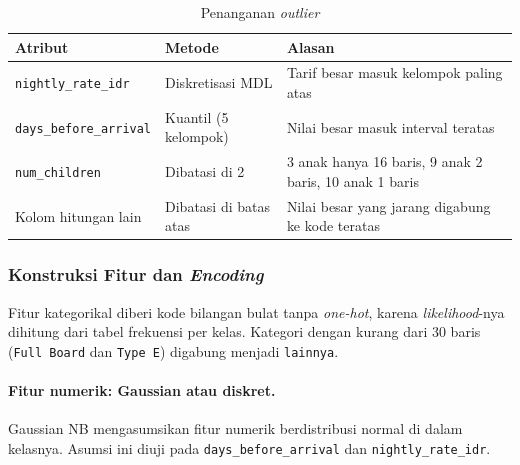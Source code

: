 {\small
{}\par}

\begin{table}[H]
	\centering
	\caption{Penanganan \textit{outlier}}
	\label{tab:nb-outlier}
	\begin{tabularx}{\textwidth}{l l Y}
		\toprule
		\textbf{Atribut} & \textbf{Metode} & \textbf{Alasan} \\
		\midrule
		\texttt{nightly\_rate\_idr} & Diskretisasi MDL & Tarif besar masuk kelompok paling atas \\
		\texttt{days\_before\_arrival} & Kuantil (5 kelompok) & Nilai besar masuk interval teratas \\
		\texttt{num\_children} & Dibatasi di 2 & 3 anak hanya 16 baris, 9 anak 2 baris, 10 anak 1 baris \\
		Kolom hitungan lain & Dibatasi di batas atas & Nilai besar yang jarang digabung ke kode teratas \\
		\bottomrule
	\end{tabularx}
\end{table}

\subsubsection{Konstruksi Fitur dan \textit{Encoding}}
Fitur kategorikal diberi kode bilangan bulat tanpa \textit{one-hot}, karena \textit{likelihood}-nya dihitung dari tabel frekuensi per kelas. Kategori dengan kurang dari 30 baris (\texttt{Full Board} dan \texttt{Type E}) digabung menjadi \texttt{lainnya}.

\paragraph{Fitur numerik: Gaussian atau diskret.} Gaussian NB mengasumsikan fitur numerik berdistribusi normal di dalam kelasnya. Asumsi ini diuji pada \texttt{days\_before\_arrival} dan \texttt{nightly\_rate\_idr}.


